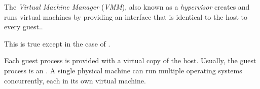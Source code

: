 \begin{definition}\label{def:Virtual_Machine_Manager}\label{def:Hypervisor}\label{def:VMM}
  The \emph{Virtual Machine Manager} (\emph{VMM}), also known as a \emph{hypervisor} creates and runs virtual machines by providing an interface that is identical to the host to every guest..
  \begin{remark}
    This is true except in the case of .
  \end{remark}
\end{definition}

Each guest process is provided with a virtual copy of the host.
Usually, the guest process is an .
A single physical machine can run multiple operating systems concurrently, each in its own virtual machine.


